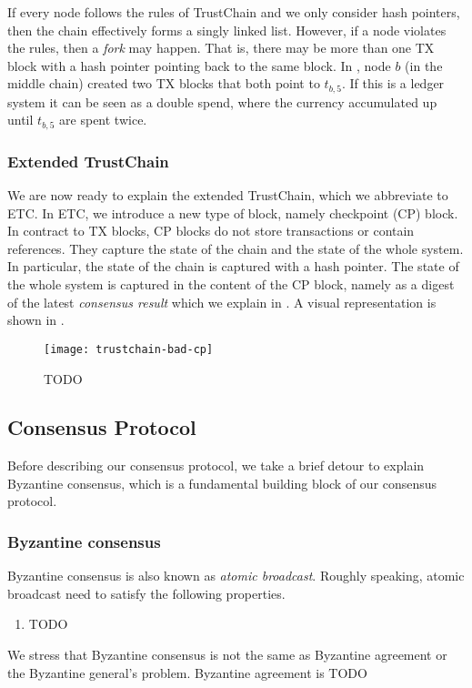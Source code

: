If every node follows the rules of TrustChain and we only consider hash pointers,
then the chain effectively forms a singly linked list.
However, if a node violates the rules, then a \emph{fork} may happen.
That is, there may be more than one TX block with a hash pointer pointing back to the same block.
In , node $b$ (in the middle chain) created two TX blocks that both point to $t_{b, 5}$.
If this is a ledger system it can be seen as a double spend, where the currency accumulated up until $t_{b, 5}$ are spent twice.

\subsubsection*{Extended TrustChain}
We are now ready to explain the extended TrustChain, which we abbreviate to ETC.
In ETC, we introduce a new type of block, namely checkpoint (CP) block.
In contract to TX blocks, CP blocks do not store transactions or contain references.
They capture the state of the chain and the state of the whole system.
In particular, the state of the chain is captured with a hash pointer.
The state of the whole system is captured in the content of the CP block,
namely as a digest of the latest \emph{consensus result} which we explain in .
A visual representation is shown in .

\begin{figure}
    \texttt{[image: trustchain-bad-cp]}
    \centering
    \caption{TODO}
    \label{fig:trustchain-bad-cp}
\end{figure}

\subsection{Consensus Protocol}\label{sec:overview-cons}
Before describing our consensus protocol, we take a brief detour to explain Byzantine consensus,
which is a fundamental building block of our consensus protocol.

\subsubsection*{Byzantine consensus}
Byzantine consensus is also known as \emph{atomic broadcast}.
Roughly speaking, atomic broadcast need to satisfy the following properties.
\begin{enumerate}
\item TODO
\end{enumerate}
We stress that Byzantine consensus is not the same as Byzantine agreement or the Byzantine general's problem.
Byzantine agreement is TODO

